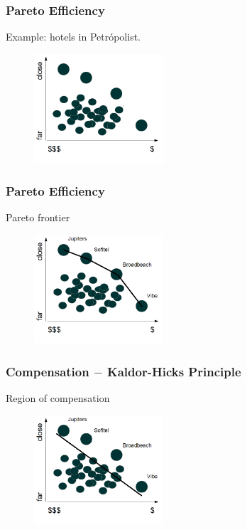 \documentclass[14pt]{beamer}
\begin{document}
\begin{frame}\frametitle{Pareto Efficiency}

Example: hotels in Petr\'{o}polist.

\begin{figure}
\centering
\includegraphics[height=1.60in]{hotel1}
\end{figure}

\end{frame}

\begin{frame}\frametitle{Pareto Efficiency}

Pareto frontier

\begin{figure}
\centering
\includegraphics[height=1.60in]{hotel2}
\end{figure}

\end{frame}

\begin{frame}\frametitle{Compensation $-$ Kaldor-Hicks Principle}

Region of compensation

\begin{figure}
\centering
\includegraphics[height=1.60in]{hotel3}
\end{figure}

\end{frame}
\end{document}
